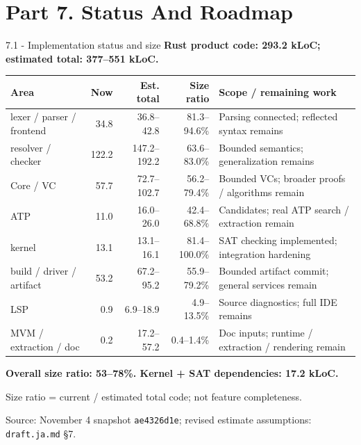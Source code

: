 \documentclass[aspectratio=169,11pt]{beamer}
\begin{document}
\section{Part 7. Status And Roadmap}
\begin{frame}[fragile,t]{7.1 - Implementation status and size}
\textcolor{blue!55!black}{\textbf{Rust product code: 293.2 kLoC; estimated total: 377–551 kLoC.}}

\par{}
\begin{scriptsize}
\setlength{\tabcolsep}{3pt}
\renewcommand{\arraystretch}{1.15}
\begin{tabularx}{\textwidth}{lrrr>{\raggedright\arraybackslash}X}
\toprule
\textbf{Area} & \textbf{Now} & \textbf{Est. total} & \textbf{Size ratio} & \textbf{Scope / remaining work} \\
\midrule
lexer / parser / frontend & 34.8 & 36.8–42.8 & 81.3–94.6\% & Parsing connected; reflected syntax remains \\
resolver / checker & 122.2 & 147.2–192.2 & 63.6–83.0\% & Bounded semantics; generalization remains \\
Core / VC & 57.7 & 72.7–102.7 & 56.2–79.4\% & Bounded VCs; broader proofs / algorithms remain \\
ATP & 11.0 & 16.0–26.0 & 42.4–68.8\% & Candidates; real ATP search / extraction remain \\
kernel & 13.1 & 13.1–16.1 & 81.4–100.0\% & SAT checking implemented; integration hardening \\
build / driver / artifact & 53.2 & 67.2–95.2 & 55.9–79.2\% & Bounded artifact commit; general services remain \\
LSP & 0.9 & 6.9–18.9 & 4.9–13.5\% & Source diagnostics; full IDE remains \\
MVM / extraction / doc & 0.2 & 17.2–57.2 & 0.4–1.4\% & Doc inputs; runtime / extraction / rendering remain \\
\bottomrule
\end{tabularx}
\end{scriptsize}

\textcolor{blue!55!black}{\textbf{Overall size ratio: 53–78\%. Kernel + SAT dependencies: 17.2 kLoC.}}

{\footnotesize Size ratio = current / estimated total code; not feature completeness.}

{\footnotesize Source: November 4 snapshot \texttt{ae4326d1e}; revised estimate assumptions: \texttt{draft.ja.md} §7.}


\end{frame}
\end{document}
